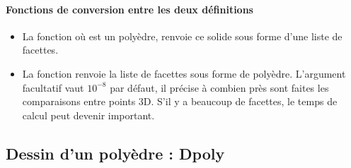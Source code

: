 \paragraph{Fonctions de conversion entre les deux définitions}
\begin{itemize}
    \item La fonction  où  est un polyèdre, renvoie ce solide sous forme d'une liste de facettes.
    \item La fonction  renvoie la liste de facettes  sous forme de polyèdre. L'argument facultatif  vaut $10^{-8}$ par défaut, il précise à combien près sont faites les comparaisons entre points 3D. S'il y a beaucoup de facettes, le temps de calcul peut devenir important.
\end{itemize}

\subsection{Dessin d'un polyèdre : Dpoly}


